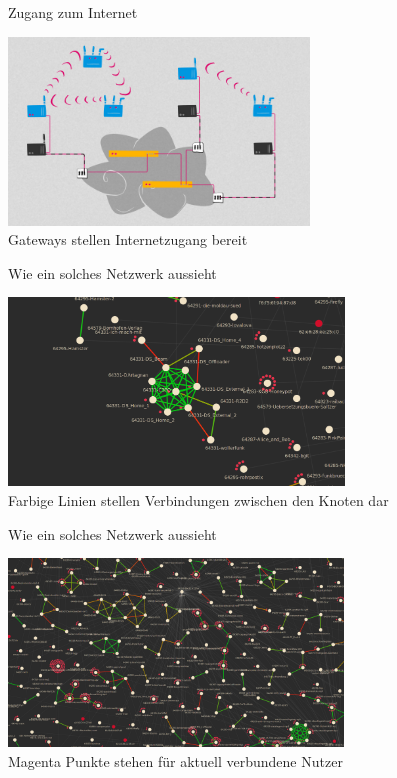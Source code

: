 \documentclass[10pt]{beamer}
\begin{document}
  \begin{frame}{Zugang zum Internet}
    \begin{center}
      \includegraphics[height=5cm]{images/network_5}\\
      \vspace{1em}
      Gateways stellen Internetzugang bereit
      \vspace{1em}
    \end{center}
  \end{frame}
  
  \begin{frame}{Wie ein solches Netzwerk aussieht}
    \begin{center}
      \includegraphics[height=5cm]{images/mesh_small}\\
      \vspace{1em}
      Farbige Linien stellen Verbindungen zwischen den Knoten dar
      \vspace{1em}
    \end{center}
  \end{frame}
  
  \begin{frame}{Wie ein solches Netzwerk aussieht}
    \begin{center}
      \includegraphics[height=5cm]{images/mesh_medium}\\
      \vspace{1em}
      Magenta Punkte stehen für aktuell verbundene Nutzer
      \vspace{1em}
    \end{center}
  \end{frame}
  
\end{document}

